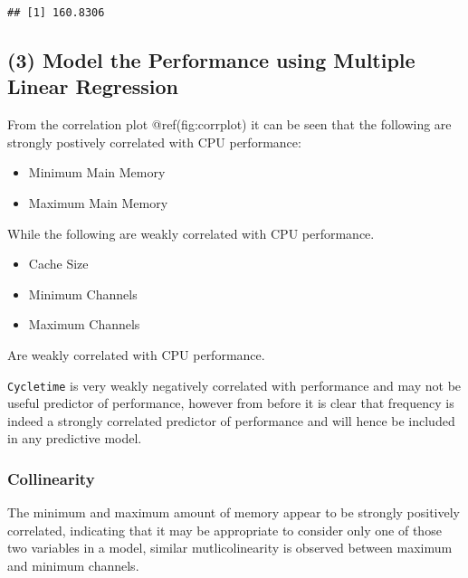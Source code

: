 \documentclass[12pt]{article}
\newenvironment{Shaded}{\begin{snugshade}}{\end{snugshade}}
\newcommand{\KeywordTok}[1]{\textcolor[rgb]{0.13,0.29,0.53}{\textbf{#1}}}
\newcommand{\NormalTok}[1]{#1}
\newcommand{\OperatorTok}[1]{\textcolor[rgb]{0.81,0.36,0.00}{\textbf{#1}}}
\providecommand{\tightlist}{%
  \setlength{\itemsep}{0pt}\setlength{\parskip}{0pt}}
\begin{document}
\begin{Shaded}
\end{Shaded}

\begin{verbatim}
## [1] 160.8306
\end{verbatim}

\hypertarget{model-the-performance-using-multiple-linear-regression}{%
\subsection{(3) Model the Performance using Multiple Linear
Regression}\label{model-the-performance-using-multiple-linear-regression}}

From the correlation plot @ref(fig:corrplot) it can be seen that the
following are strongly postively correlated with CPU performance:

\begin{itemize}
\tightlist
\item
  Minimum Main Memory
\item
  Maximum Main Memory
\end{itemize}

While the following are weakly correlated with CPU performance.

\begin{itemize}
\tightlist
\item
  Cache Size
\item
  Minimum Channels
\item
  Maximum Channels
\end{itemize}

Are weakly correlated with CPU performance.

\texttt{Cycletime} is very weakly negatively correlated with performance
and may not be useful predictor of performance, however from before it
is clear that frequency is indeed a strongly correlated predictor of
performance and will hence be included in any predictive model.

\hypertarget{collinearity}{%
\subsubsection{Collinearity}\label{collinearity}}

The minimum and maximum amount of memory appear to be strongly
positively correlated, indicating that it may be appropriate to consider
only one of those two variables in a model, similar mutlicolinearity is
observed between maximum and minimum channels.
\end{document}
